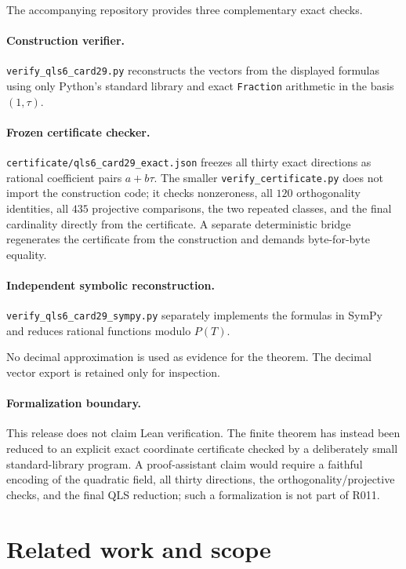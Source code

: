 \documentclass[11pt]{article}
\theoremstyle{definition}
\theoremstyle{plain}
\begin{document}
The accompanying repository provides three complementary exact checks.

\paragraph{Construction verifier.}
\texttt{verify\_qls6\_card29.py} reconstructs the vectors from the displayed formulas using only Python's standard library and exact \texttt{Fraction} arithmetic in the basis \((1,\tau)\).

\paragraph{Frozen certificate checker.}
\texttt{certificate/qls6\_card29\_exact.json} freezes all thirty exact directions as rational coefficient pairs \(a+b\tau\).
The smaller \texttt{verify\_certificate.py} does not import the construction code; it checks nonzeroness, all \(120\) orthogonality identities, all \(435\) projective comparisons, the two repeated classes, and the final cardinality directly from the certificate.
A separate deterministic bridge regenerates the certificate from the construction and demands byte-for-byte equality.

\paragraph{Independent symbolic reconstruction.}
\texttt{verify\_qls6\_card29\_sympy.py} separately implements the formulas in SymPy and reduces rational functions modulo \(P(T)\).

No decimal approximation is used as evidence for the theorem.
The decimal vector export is retained only for inspection.

\paragraph{Formalization boundary.}
This release does not claim Lean verification.
The finite theorem has instead been reduced to an explicit exact coordinate certificate checked by a deliberately small standard-library program.
A proof-assistant claim would require a faithful encoding of the quadratic field, all thirty directions, the orthogonality/projective checks, and the final QLS reduction; such a formalization is not part of R011.

\section{Related work and scope}
\end{document}
